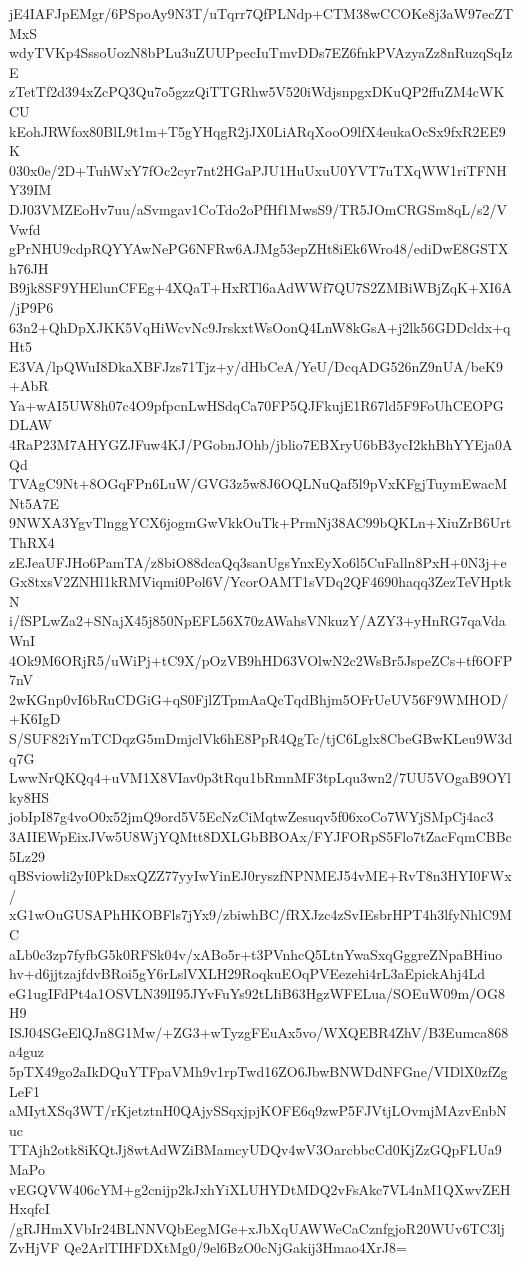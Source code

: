 jE4IAFJpEMgr/6PSpoAy9N3T/uTqrr7QfPLNdp+CTM38wCCOKe8j3aW97ecZTMxS
wdyTVKp4SssoUozN8bPLu3uZUUPpecIuTmvDDs7EZ6fnkPVAzyaZz8nRuzqSqIzE
zTetTf2d394xZcPQ3Qu7o5gzzQiTTGRhw5V520iWdjsnpgxDKuQP2ffuZM4cWKCU
kEohJRWfox80BlL9t1m+T5gYHqgR2jJX0LiARqXooO9lfX4eukaOcSx9fxR2EE9K
030x0e/2D+TuhWxY7fOc2cyr7nt2HGaPJU1HuUxuU0YVT7uTXqWW1riTFNHY39IM
DJ03VMZEoHv7uu/aSvmgav1CoTdo2oPfHf1MwsS9/TR5JOmCRGSm8qL/s2/VVwfd
gPrNHU9cdpRQYYAwNePG6NFRw6AJMg53epZHt8iEk6Wro48/ediDwE8GSTXh76JH
B9jk8SF9YHElunCFEg+4XQaT+HxRTl6aAdWWf7QU7S2ZMBiWBjZqK+XI6A/jP9P6
63n2+QhDpXJKK5VqHiWcvNc9JrskxtWsOonQ4LnW8kGsA+j2lk56GDDcldx+qHt5
E3VA/lpQWuI8DkaXBFJzs71Tjz+y/dHbCeA/YeU/DcqADG526nZ9nUA/beK9+AbR
Ya+wAI5UW8h07c4O9pfpcnLwHSdqCa70FP5QJFkujE1R67ld5F9FoUhCEOPGDLAW
4RaP23M7AHYGZJFuw4KJ/PGobnJOhb/jblio7EBXryU6bB3ycI2khBhYYEja0AQd
TVAgC9Nt+8OGqFPn6LuW/GVG3z5w8J6OQLNuQaf5l9pVxKFgjTuymEwacMNt5A7E
9NWXA3YgvTlnggYCX6jogmGwVkkOuTk+PrmNj38AC99bQKLn+XiuZrB6UrtThRX4
zEJeaUFJHo6PamTA/z8biO88dcaQq3sanUgsYnxEyXo6l5CuFalln8PxH+0N3j+e
Gx8txsV2ZNHl1kRMViqmi0Pol6V/YcorOAMT1sVDq2QF4690haqq3ZezTeVHptkN
i/fSPLwZa2+SNajX45j850NpEFL56X70zAWahsVNkuzY/AZY3+yHnRG7qaVdaWnI
4Ok9M6ORjR5/uWiPj+tC9X/pOzVB9hHD63VOlwN2c2WsBr5JspeZCs+tf6OFP7nV
2wKGnp0vI6bRuCDGiG+qS0FjlZTpmAaQcTqdBhjm5OFrUeUV56F9WMHOD/+K6IgD
S/SUF82iYmTCDqzG5mDmjclVk6hE8PpR4QgTc/tjC6Lglx8CbeGBwKLeu9W3dq7G
LwwNrQKQq4+uVM1X8VIav0p3tRqu1bRmnMF3tpLqu3wn2/7UU5VOgaB9OYlky8HS
jobIpI87g4voO0x52jmQ9ord5V5EcNzCiMqtwZesuqv5f06xoCo7WYjSMpCj4ac3
3AIIEWpEixJVw5U8WjYQMtt8DXLGbBBOAx/FYJFORpS5Flo7tZacFqmCBBc5Lz29
qBSviowli2yI0PkDsxQZZ77yyIwYinEJ0ryszfNPNMEJ54vME+RvT8n3HYI0FWx/
xG1wOuGUSAPhHKOBFls7jYx9/zbiwhBC/fRXJzc4zSvIEsbrHPT4h3lfyNhlC9MC
aLb0c3zp7fyfbG5k0RFSk04v/xABo5r+t3PVnhcQ5LtnYwaSxqGggreZNpaBHiuo
hv+d6jjtzajfdvBRoi5gY6rLslVXLH29RoqkuEOqPVEezehi4rL3aEpickAhj4Ld
eG1ugIFdPt4a1OSVLN39lI95JYvFuYs92tLIiB63HgzWFELua/SOEuW09m/OG8H9
ISJ04SGeElQJn8G1Mw/+ZG3+wTyzgFEuAx5vo/WXQEBR4ZhV/B3Eumca868a4guz
5pTX49go2aIkDQuYTFpaVMh9v1rpTwd16ZO6JbwBNWDdNFGne/VIDlX0zfZgLeF1
aMIytXSq3WT/rKjetztnH0QAjySSqxjpjKOFE6q9zwP5FJVtjLOvmjMAzvEnbNuc
TTAjh2otk8iKQtJj8wtAdWZiBMamcyUDQv4wV3OarcbbcCd0KjZzGQpFLUa9MaPo
vEGQVW406cYM+g2cnijp2kJxhYiXLUHYDtMDQ2vFsAkc7VL4nM1QXwvZEHHxqfcI
/gRJHmXVbIr24BLNNVQbEegMGe+xJbXqUAWWeCaCznfgjoR20WUv6TC3ljZvHjVF
Qe2ArlTIHFDXtMg0/9el6BzO0cNjGakij3Hmao4XrJ8=
